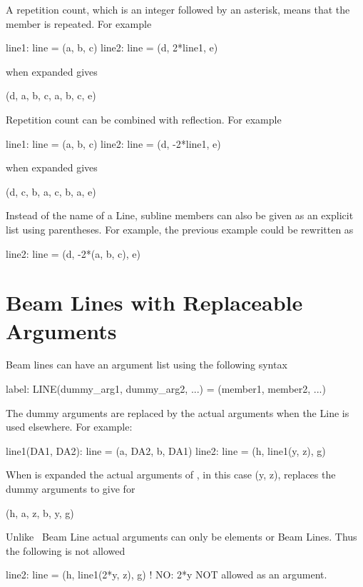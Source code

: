 A repetition count, which is an integer followed by an asterisk, means that the member is
repeated. For example
\begin{example}
  line1: line = (a, b, c)
  line2: line = (d, 2*line1, e)
\end{example}
 when expanded gives
\begin{example}
  (d, a, b, c, a, b, c, e)
\end{example}
Repetition count can be combined with reflection. For example
\begin{example}
  line1: line = (a, b, c)
  line2: line = (d, -2*line1, e)
\end{example}
 when expanded gives
\begin{example}
  (d, c, b, a, c, b, a, e)
\end{example}
Instead of the name of a Line, subline members can also be given as an explicit list using parentheses. For example, the previous example could be rewritten as
\begin{example}
  line2: line = (d, -2*(a, b, c), e)
\end{example}

\section{Beam Lines with Replaceable Arguments}

Beam lines can have an argument list using the following syntax
\begin{example}
  label: LINE(dummy_arg1, dummy_arg2, ...) = (member1, member2, ...)
\end{example}
The dummy arguments are replaced by the actual arguments when the Line is used
elsewhere. For example:
\begin{example}
  line1(DA1, DA2): line = (a, DA2, b, DA1)
  line2: line = (h, line1(y, z), g)
\end{example}
When  is expanded the actual arguments of , in this case \vn(y, z),
replaces the dummy arguments  to give for 
\begin{example}
  (h, a, z, b, y, g)
\end{example} 
Unlike \mad\, Beam Line actual arguments can only be elements or Beam Lines. 
Thus the following is not allowed
\begin{example}
  line2: line = (h, line1(2*y, z), g)   ! NO: 2*y NOT allowed as an argument.
\end{example}

